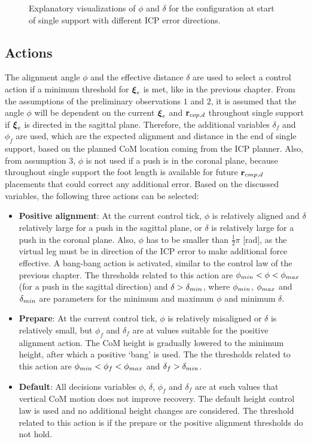 \begin{figure}[h]
\begin{subfigure}{0.49\textwidth}
    \caption{}
     \label{fig:phiVizf}
  \end{subfigure}
  \caption{Explanatory visualizations of $\phi$ and $\delta$ for the configuration at start of single support with different \ac{ICP} error directions.}
  \label{fig:phiViz}
\end{figure}

\subsection{Actions}
The alignment angle $\phi$ and the effective distance $\delta$ are used to select a control action if a minimum threshold for $\boldsymbol{\xi}_e$ is met, like in the previous chapter. From the assumptions of the preliminary observations $1$ and $2$, it is assumed that the angle $\phi$ will be dependent on the current $\boldsymbol{\xi}_e$ and $\mathbf{r}_{cop,d}$ throughout single support if $\boldsymbol{\xi}_e$ is directed in the sagittal plane. Therefore, the additional variables $\delta_f$ and $\phi_f$ are used, which are the expected alignment and distance in the end of single support, based on the planned \ac{CoM} location coming from the \ac{ICP} planner. Also, from assumption $3$, $\phi$ is not used if a push is in the coronal plane, because throughout single support the foot length is available for future $\mathbf{r}_{cmp,d}$ placements that could correct any additional error. Based on the discussed variables, the following three actions can be selected:
\begin{itemize}
	\item \textbf{Positive alignment}: At the current control tick, $\phi$ is relatively aligned and $\delta$ relatively large for a push in the sagittal plane, or $\delta$ is relatively large for a push in the coronal plane. Also, $\phi$ has to be smaller than $\frac{1}{2}\pi$ [rad], as the virtual leg must be in direction of the \ac{ICP} error to make additional force effective. A bang-bang action is activated, similar to the control law of the previous chapter. The thresholds related to this action are $\phi_{min} < \phi < \phi_{max}$ (for a push in the sagittal direction) and $\delta > \delta_{min}$, where $\phi_{min}$, $\phi_{max}$ and $\delta_{min}$ are parameters for the minimum and maximum $\phi$ and minimum $\delta$.
	\item \textbf{Prepare}: At the current control tick, $\phi$ is relatively misaligned or $\delta$ is relatively small, but $\phi_f$ and $\delta_f$ are at values suitable for the positive alignment action. The \ac{CoM} height is gradually lowered to the minimum height, after which a positive `bang' is used. The the thresholds related to this action are $\phi_{min}<\phi_f<\phi_{max}$ and $\delta_f>\delta_{min}$.
	\item \textbf{Default}: All decisions variables $\phi$, $\delta$, $\phi_f$ and $\delta_f$ are at such values that vertical \ac{CoM} motion does not improve recovery. The default height control law is used and no additional height changes are considered. The threshold related to this action is if the prepare or the positive alignment thresholds do not hold.
\end{itemize}

